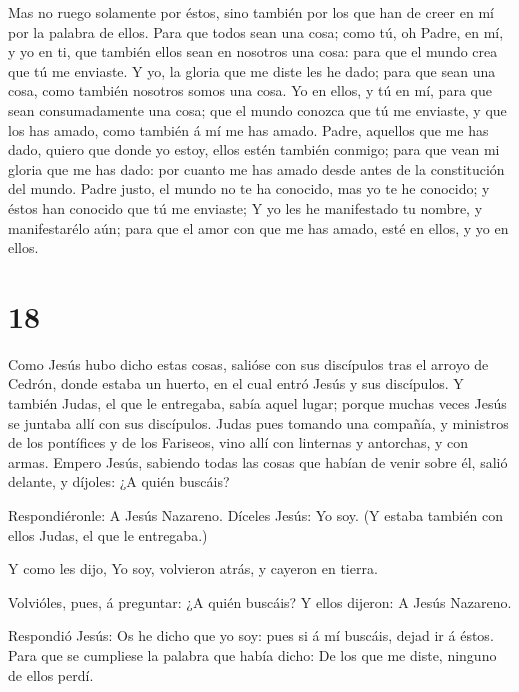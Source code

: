  Mas no ruego solamente por éstos, sino también por los que
han de creer en mí por la palabra de ellos.  Para que todos
sean una cosa; como tú, oh Padre, en mí, y yo en ti, que también ellos
sean en nosotros una cosa: para que el mundo crea que tú me enviaste.
 Y yo, la gloria que me diste les he dado; para que sean
una cosa, como también nosotros somos una cosa.  Yo en
ellos, y tú en mí, para que sean consumadamente una cosa; que el mundo
conozca que tú me enviaste, y que los has amado, como también á mí me
has amado.  Padre, aquellos que me has dado, quiero que
donde yo estoy, ellos estén también conmigo; para que vean mi gloria que
me has dado: por cuanto me has amado desde antes de la constitución del
mundo.  Padre justo, el mundo no te ha conocido, mas yo te
he conocido; y éstos han conocido que tú me enviaste;  Y yo
les he manifestado tu nombre, y manifestarélo aún; para que el amor con
que me has amado, esté en ellos, y yo en ellos.

\hypertarget{section-17}{%
\section{18}\label{section-17}}

 Como Jesús hubo dicho estas cosas, salióse con sus
discípulos tras el arroyo de Cedrón, donde estaba un huerto, en el cual
entró Jesús y sus discípulos.  Y también Judas, el que le
entregaba, sabía aquel lugar; porque muchas veces Jesús se juntaba allí
con sus discípulos.  Judas pues tomando una compañía, y
ministros de los pontífices y de los Fariseos, vino allí con linternas y
antorchas, y con armas.  Empero Jesús, sabiendo todas las
cosas que habían de venir sobre él, salió delante, y díjoles: ¿A quién
buscáis?

 Respondiéronle: A Jesús Nazareno. Díceles Jesús: Yo soy. (Y
estaba también con ellos Judas, el que le entregaba.)

 Y como les dijo, Yo soy, volvieron atrás, y cayeron en
tierra.

 Volvióles, pues, á preguntar: ¿A quién buscáis? Y ellos
dijeron: A Jesús Nazareno.

 Respondió Jesús: Os he dicho que yo soy: pues si á mí
buscáis, dejad ir á éstos.  Para que se cumpliese la palabra
que había dicho: De los que me diste, ninguno de ellos perdí.

